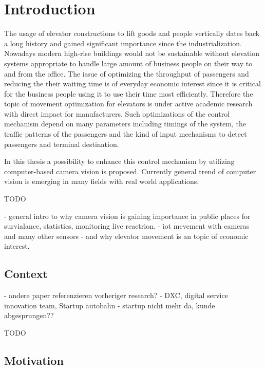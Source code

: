 \chapter{Introduction}
\label{chap:intro}


The usage of elevator constructions to lift goods and people vertically dates back a long history and gained significant importance since the industrialization.
Nowadays modern high-rise buildings would not be sustainable without elevation systems appropriate to handle large amount of business people on their way to and from the office. 
The issue of optimizing the throughput of passengers and reducing the their waiting time is of everyday economic interest since it is critical for the business people using it to use their time most efficiently. 
Therefore the topic of movement optimization for elevators is under active academic research with direct impact for manufacturers.
Such optimizations of the control mechanism depend on many parameters including timings of the system, the traffic patterns of the passengers and the kind of input mechanisms to detect passengers and terminal destination.

In this thesis a possibility to enhance this control mechanism by utilizing computer-based camera vision is proposed.
Currently general trend of computer vision is emerging in many fields with real world applications.



TODO


- general intro to why camera vision is gaining importance in public places for survialance, statistics, monitoring live reactrion. 
- iot mevement with cameras and many other sensors
- and why elevator movement is an topic of economic interest.


\section{Context}

- andere paper referenzieren vorheriger research?
- DXC, digital service innovation team, Startup autobahn
- startup nicht mehr da, kunde abgesprungen??


TODO

\section{Motivation}


